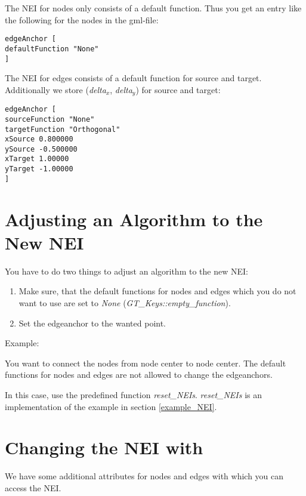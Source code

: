 \documentclass[twoside,fleqn]{report}
\begin{document}
The NEI for nodes only consists of a default function. Thus you get an 
entry like the following for the nodes in the gml-file:

\begin{verbatim}
edgeAnchor [
defaultFunction "None"
]
\end{verbatim}

The NEI for edges consists of a default function for source and target.
Additionally we store (\emph{delta$_x$}, \emph{delta$_y$}) for source and 
target:

\begin{verbatim}
edgeAnchor [
sourceFunction "None"
targetFunction "Orthogonal"
xSource 0.800000
ySource -0.500000
xTarget 1.00000
yTarget -1.00000
]
\end{verbatim}

\section{Adjusting an Algorithm to the New NEI}

You have to do two things to adjust an algorithm to the new NEI:

\begin{enumerate}
  \item Make sure, that the default functions for nodes and edges which you 
    do not want to use are set to \emph{None} 
    (\emph{GT\_Keys::empty\_function}).

  \item Set the edgeanchor to the wanted point.

\end{enumerate}

Example:

You want to connect the nodes from node center to node center. The default
functions for nodes and edges are not allowed to change the edgeanchors.

In this case, use the  predefined function \emph{reset\_NEIs}. 
\emph{reset\_NEIs} is an implementation of the example in 
section \ref{example_NEI}.

\section{Changing the NEI with \GraphScript{}}

We have some additional attributes for nodes and edges with which you can 
access the NEI.
\end{document}
